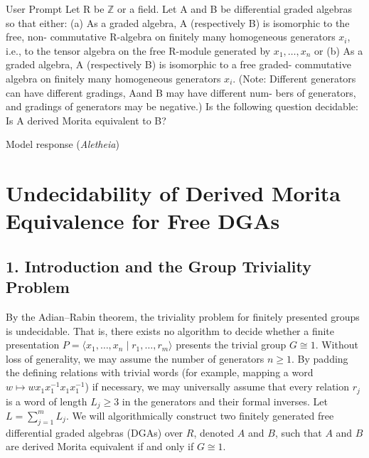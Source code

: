 \documentclass{article}
\theoremstyle{plain}
\theoremstyle{definition}
\begin{document}
\begin{problem}{User Prompt} Let R be $\mathbb{Z}$ or a field. Let A and B be differential graded
algebras so that either:
(a) As a graded algebra, A (respectively B) is isomorphic to the free, non-
commutative R-algebra on finitely many homogeneous generators $x_i$, i.e.,
to the tensor algebra on the free R-module generated by $x_1,\dots,x_n$ or
(b) As a graded algebra, A (respectively B) is isomorphic to a free graded-
commutative algebra on finitely many homogeneous generators $x_i$.
(Note: Different generators can have different gradings, Aand B may have different num-
bers of generators, and gradings of generators may be negative.)
Is the following question decidable:  Is A derived Morita equivalent to B?
\end{problem}

\begin{solution}{Model response (\emph{Aletheia})}
    \section*{Undecidability of Derived Morita Equivalence for Free DGAs}

\subsection*{1. Introduction and the Group Triviality Problem}
By the Adian--Rabin theorem, the triviality problem for finitely presented groups is undecidable. That is, there exists no algorithm to decide whether a finite presentation $P = \langle x_1, \dots, x_n \mid r_1, \dots, r_m \rangle$ presents the trivial group $G \cong 1$. Without loss of generality, we may assume the number of generators $n \ge 1$. By padding the defining relations with trivial words (for example, mapping a word $w \mapsto w x_1 x_1^{-1} x_1 x_1^{-1}$) if necessary, we may universally assume that every relation $r_j$ is a word of length $L_j \ge 3$ in the generators and their formal inverses. Let $L = \sum_{j=1}^m L_j$. We will algorithmically construct two finitely generated free differential graded algebras (DGAs) over $R$, denoted $A$ and $B$, such that $A$ and $B$ are derived Morita equivalent if and only if $G \cong 1$.


\end{solution}
\end{document}
